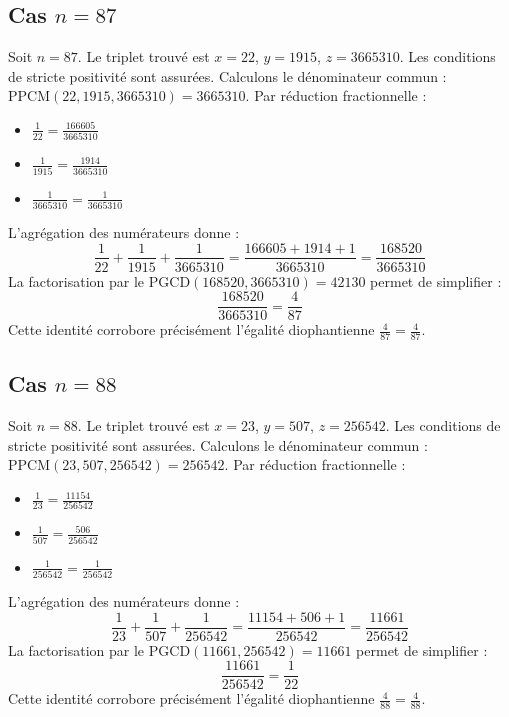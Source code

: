 \documentclass[11pt,a4paper]{article}
\begin{document}
\subsection{Cas $n = 87$}
Soit $n = 87$. Le triplet trouvé est $x = 22$, $y = 1915$, $z = 3665310$.
Les conditions de stricte positivité sont assurées.
Calculons le dénominateur commun : $\text{PPCM}(22, 1915, 3665310) = 3665310$.
Par réduction fractionnelle :
\begin{itemize}
    \item $\frac{1}{22} = \frac{166605}{3665310}$
    \item $\frac{1}{1915} = \frac{1914}{3665310}$
    \item $\frac{1}{3665310} = \frac{1}{3665310}$
\end{itemize}
L'agrégation des numérateurs donne :
$$ \frac{1}{22} + \frac{1}{1915} + \frac{1}{3665310} = \frac{166605 + 1914 + 1}{3665310} = \frac{168520}{3665310} $$
La factorisation par le $\text{PGCD}(168520, 3665310) = 42130$ permet de simplifier :
$$ \frac{168520}{3665310} = \frac{4}{87} $$
Cette identité corrobore précisément l'égalité diophantienne $\frac{4}{87} = \frac{4}{87}$.

\subsection{Cas $n = 88$}
Soit $n = 88$. Le triplet trouvé est $x = 23$, $y = 507$, $z = 256542$.
Les conditions de stricte positivité sont assurées.
Calculons le dénominateur commun : $\text{PPCM}(23, 507, 256542) = 256542$.
Par réduction fractionnelle :
\begin{itemize}
    \item $\frac{1}{23} = \frac{11154}{256542}$
    \item $\frac{1}{507} = \frac{506}{256542}$
    \item $\frac{1}{256542} = \frac{1}{256542}$
\end{itemize}
L'agrégation des numérateurs donne :
$$ \frac{1}{23} + \frac{1}{507} + \frac{1}{256542} = \frac{11154 + 506 + 1}{256542} = \frac{11661}{256542} $$
La factorisation par le $\text{PGCD}(11661, 256542) = 11661$ permet de simplifier :
$$ \frac{11661}{256542} = \frac{1}{22} $$
Cette identité corrobore précisément l'égalité diophantienne $\frac{4}{88} = \frac{4}{88}$.
\end{document}
